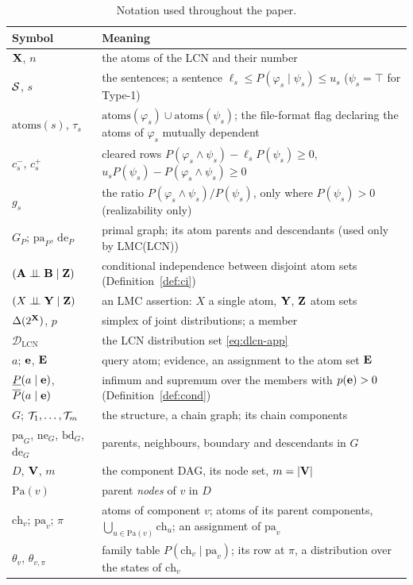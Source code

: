 \documentclass{article} %
\newcommand{\lo}{\underline}
\newcommand{\hi}{\overline}
\newcommand{\indep}{\perp\!\!\!\perp}
\newcommand{\DLCN}{\mathcal{D}_{\mathrm{LCN}}}
\newcommand{\ch}{\mathrm{ch}}
\newcommand{\pa}{\mathrm{pa}}
\newcommand{\atoms}{\mathrm{atoms}}
\providecommand{\Pa}{\mathrm{Pa}}
\begin{document}
\begin{table}[h]
\centering
\small
\caption{Notation used throughout the paper.}
\label{tab:notation}
\begin{tabularx}{\linewidth}{@{}l X@{}}
\toprule
Symbol & Meaning\\
\midrule
$\mathbf{X}$, $n$ & the atoms of the LCN and their number\\
$\mathcal{S}$, $s$ & the sentences; a sentence $\ell_s\le P(\varphi_s\mid\psi_s)\le u_s$ ($\psi_s=\top$ for Type-1)\\
$\atoms(s)$, $\tau_s$ & $\atoms(\varphi_s)\cup\atoms(\psi_s)$; the file-format flag declaring the atoms of $\varphi_s$ mutually dependent\\
$c_s^-$, $c_s^+$ & cleared rows $P(\varphi_s\wedge\psi_s)-\ell_sP(\psi_s)\ge0$, $u_sP(\psi_s)-P(\varphi_s\wedge\psi_s)\ge0$\\
$g_s$ & the ratio $P(\varphi_s\wedge\psi_s)/P(\psi_s)$, only where $P(\psi_s)>0$ (realizability only)\\
$G_P$; $\pa_P$, $\mathrm{de}_P$ & primal graph; its atom parents and descendants (used only by LMC(LCN))\\
$(\bA\indep\bB\mid\bZ)$ & conditional independence between disjoint atom sets (Definition~\ref{def:ci})\\
$(X\indep\bY\mid\bZ)$ & an LMC assertion: $X$ a single atom, $\mathbf{Y}$, $\mathbf{Z}$ atom sets\\
$\Delta(2^{\mathbf{X}})$, $p$ & simplex of joint distributions; a member\\
$\DLCN$ & the LCN distribution set \eqref{eq:dlcn-app}\\
$a$; $\mathbf{e}$, $\mathbf{E}$ & query atom; evidence, an assignment to the atom set $\mathbf{E}$\\
$\lo P(a\mid\be)$, $\hi P(a\mid\be)$ & infimum and supremum over the members with $p(\mathbf{e})>0$ (Definition~\ref{def:cond})\\
$G$; $\mathcal{T}_1,\dots,\mathcal{T}_m$ & the structure, a chain graph; its chain components\\
$\pa_G$, $\mathrm{ne}_G$, $\mathrm{bd}_G$, $\mathrm{de}_G$ & parents, neighbours, boundary and descendants in $G$\\
$D$, $\mathbf{V}$, $m$ & the component DAG, its node set, $m=|\mathbf{V}|$\\
$\Pa(v)$ & parent \emph{nodes} of $v$ in $D$\\
$\ch_v$; $\pa_v$; $\pi$ & atoms of component $v$; atoms of its parent components, $\bigcup_{u\in\Pa(v)}\ch_u$; an assignment of $\pa_v$\\
$\theta_v$, $\theta_{v,\pi}$ & family table $P(\ch_v\mid\pa_v)$; its row at $\pi$, a distribution over the states of $\ch_v$\\

\end{tabularx}
\end{table}
\end{document}
